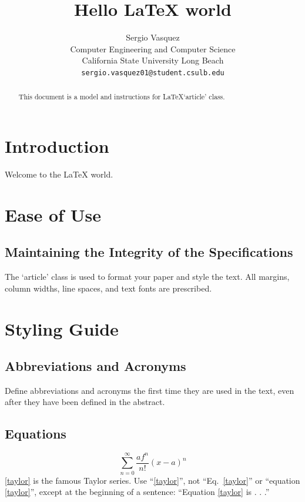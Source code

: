 \documentclass{article}
\begin{document}
\title{Hello \LaTeX\xspace world}

\author{Sergio Vasquez\\
\small{Computer Engineering and Computer Science}\\
\small{California State University Long Beach}\\
\small{\texttt{sergio.vasquez01@student.csulb.edu}}}
\date{}
\maketitle

\begin{abstract}
This document is a model and instructions for \LaTeX\xspace `article' class.
\end{abstract}

\section{Introduction}
Welcome to the \LaTeX\xspace world.
\section{Ease of Use}

\subsection{Maintaining the Integrity of the Specifications}
The `article' class is used to format your paper and style the text. All margins, column widths, line spaces, and text fonts are prescribed.

\section{Styling Guide}

\subsection{Abbreviations and Acronyms}
Define abbreviations and acronyms the first time they are used in the text, 
even after they have been defined in the abstract.

\subsection{Equations}
\begin{equation}
\sum_{n=0}^{\infty}\frac{af^{n}}{n!}(x-a)^n
\label{taylor}
\end{equation}
\eqref{taylor} is the famous Taylor series. Use ``\eqref{taylor}'', not ``Eq.~\eqref{taylor}'' or ``equation \eqref{taylor}'', except at the beginning of a sentence: ``Equation \eqref{taylor} is . . .''
\end{document}
